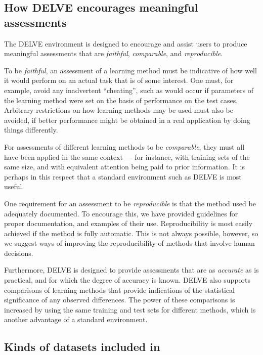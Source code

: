 \subsection{How DELVE encourages meaningful assessments}\label{scope-req}

The DELVE environment is designed to encourage and assist users to
produce meaningful assessments that are \emph{faithful},
\emph{comparable}, and \emph{reproducible}.  

To be \emph{faithful}, an assessment of a learning method must be
indicative of how well it would perform on an actual task that is of
some interest.  One must, for example, avoid any inadvertent
``cheating'', such as would occur if parameters of the learning method
were set on the basis of performance on the test cases.  Arbitrary
restrictions on how learning methods may be used must also be avoided,
if better performance might be obtained in a real application by doing
things differently.

For assessments of different learning methods to be \emph{comparable},
they must all have been applied in the same context --- for instance,
with training sets of the same size, and with equivalent attention
being paid to prior information.  It is perhaps in this respect that a
standard environment such as DELVE is most useful.

One requirement for an assessment to be \emph{reproducible} is that
the method used be adequately documented.  To encourage this, we
have provided guidelines for proper documentation, and examples of
their use.  Reproducibility is most easily achieved if the method
is fully automatic.  This is not always possible, however, so we
suggest ways of improving the reproducibility of methods that
involve human decisions.

Furthermore, DELVE is designed to provide assessments that are as {\em
accurate\/} as is practical, and for which the degree of accuracy is
known.  DELVE also supports comparisons of learning methods that
provide indications of the statistical significance of any observed
differences.  The power of these comparisons is increased by using the
same training and test sets for different methods, which is another
advantage of a standard environment.


\subsection{Kinds of datasets included in \delve{}}\label{scope-data}

